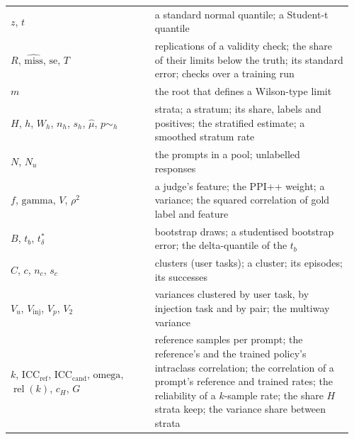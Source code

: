 \documentclass[11pt]{article}
\begin{document}
\begin{longtable}{@{}>{\raggedright\arraybackslash}p{0.406\linewidth}>{\raggedright\arraybackslash}p{0.558\linewidth}@{}}
\hspace{0pt}$z$, $t$ & \hspace{0pt}a standard normal quantile; a Student-t quantile \\
\hspace{0pt}$R$, $\hat{\mathrm{miss}}$, $\mathrm{se}$, $T$ & \hspace{0pt}replications of a validity check; the share of their limits below the truth; its standard error; checks over a training run \\
\hspace{0pt}$m$ & \hspace{0pt}the root that defines a Wilson-type limit \\
\hspace{0pt}$H$, $h$, $W_{h}$, $n_{h}$, $s_{h}$, $\hat{\mu}$, $p \sim _h$ & \hspace{0pt}strata; a stratum; its share, labels and positives; the stratified estimate; a smoothed stratum rate \\
\hspace{0pt}$N$, $N_{u}$ & \hspace{0pt}the prompts in a pool; unlabelled responses \\
\hspace{0pt}$f$, $\text{gamma}$, $V$, $\rho ^{2}$ & \hspace{0pt}a judge's feature; the PPI++ weight; a variance; the squared correlation of gold label and feature \\
\hspace{0pt}$B$, $t_{b}$, $t^{*}_{\delta}$ & \hspace{0pt}bootstrap draws; a studentised bootstrap error; the delta-quantile of the $t_{b}$ \\
\hspace{0pt}$C$, $c$, $n_{c}$, $s_{c}$ & \hspace{0pt}clusters (user tasks); a cluster; its episodes; its successes \\
\hspace{0pt}$V_{u}$, $V_{\mathrm{inj}}$, $V_{p}$, $V_{2}$ & \hspace{0pt}variances clustered by user task, by injection task and by pair; the multiway variance \\
\hspace{0pt}$k$, $\mathrm{ICC}_{\mathrm{ref}}$, $\mathrm{ICC}_{\mathrm{cand}}$, $\text{omega}$, $\operatorname{rel} (k )$, $c_{H}$, $G$ & \hspace{0pt}reference samples per prompt; the reference's and the trained policy's intraclass correlation; the correlation of a prompt's reference and trained rates; the reliability of a $k$-sample rate; the share $H$ strata keep; the variance share between strata \\

\end{longtable}
\end{document}
